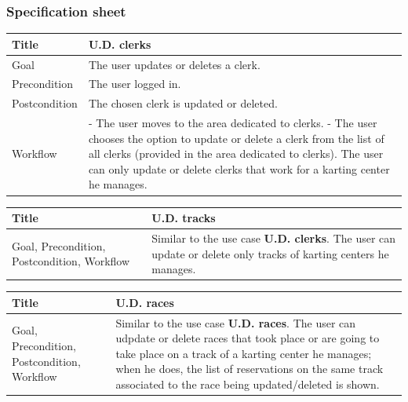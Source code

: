 \documentclass{beamer}
\begin{document}
\begin{frame}
    \frametitle{Specification sheet}
    \begin{table}
        \tiny
        \begin{tabular}{|p{2cm}|p{6cm}|}
        \hline  
        Title & \textbf{U.D. clerks} \\
        \hline
        Goal & The user updates or deletes a clerk. \\
        \hline
        Precondition & The user logged in. \\
        \hline
        Postcondition & The chosen clerk is updated or deleted. \\
        \hline
        Workflow &
        - The user moves to the area dedicated to clerks. \newline
        - The user chooses the option to update or delete a clerk from
        the list of all clerks (provided in the area dedicated to clerks). 
        The user can only update or delete clerks that work for a karting center he manages.\\
        \hline
        \end{tabular}
\end{table}

\begin{table}
    \tiny
    \begin{tabular}{|p{2cm}|p{6cm}|}
    \hline  
    Title & \textbf{U.D. tracks} \\
    \hline
    Goal, Precondition, Postcondition, Workflow & Similar to the use case \textbf{U.D. clerks}.
    The user can update or delete only tracks of karting centers he manages.\\
    \hline
    \end{tabular}
\end{table}

\begin{table}
    \tiny
    \begin{tabular}{|p{2cm}|p{6cm}|}
    \hline  
    Title & \textbf{U.D. races} \\
    \hline
    Goal, Precondition, Postcondition, Workflow & Similar to the use case \textbf{U.D. races}.
    The user can udpdate or delete races that took place or are going to take place on a track 
    of a karting center he manages; when he does, the list of reservations on the same track 
    associated to the race being updated/deleted is shown.\\
    \hline
    \end{tabular}
\end{table}
\end{frame}
\end{document}
